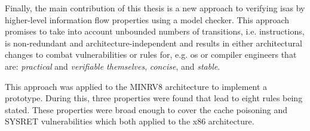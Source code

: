 Finally, the main contribution of this thesis is a new approach to verifying \glspl{isa} by higher-level information flow properties using a model checker.
This approach promises to take into account unbounded numbers of transitions, i.e. instructions, is non-redundant and architecture-independent and results in either architectural changes to combat vulnerabilities or rules for, e.g. \gls{os} or compiler engineers that are: \textit{practical} and \textit{verifiable themselves}, \textit{concise}, and \textit{stable}.

This approach was applied to the MINRV8 architecture to implement a prototype.
During this, three properties were found that lead to eight rules being stated.
These properties were broad enough to cover the cache poisoning and SYSRET vulnerabilities which both applied to the x86 architecture.
